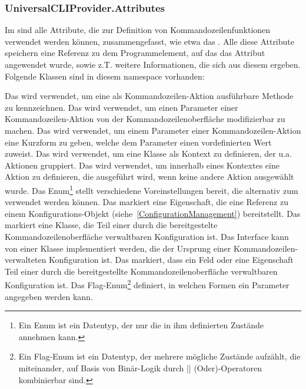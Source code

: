 \subsubsection{UniversalCLIProvider.Attributes}
Im  sind alle Attribute, die zur Definition von Kommandozeilenfunktionen verwendet werden können, zusammengefasst, wie etwa das .
Alle diese Attribute speichern eine Referenz zu dem Programmelement, auf das das Attribut angewendet wurde, sowie z.T. weitere Informationen, die sich aus diesem ergeben.
Folgende Klassen sind in diesem namespace vorhanden:
\begin{outline}
 \1 Das  wird verwendet, um eine als Kommandozeilen-Aktion ausführbare Methode zu kennzeichnen.
 \1 Das  wird verwendet, um einen Parameter einer Kommandozeilen-Aktion von der Kommandozeilenoberfläche modifizierbar zu machen.
 \1 Das  wird verwendet, um einem Parameter einer Kommandozeilen-Aktion eine Kurzform zu geben, welche dem Parameter einen vordefinierten Wert zuweist.
 \1 Das  wird verwendet, um eine Klasse als Kontext zu definieren, der u.a. Aktionen gruppiert.
 \1 Das  wird verwendet, um innerhalb eines Kontextes eine Aktion zu definieren, die ausgeführt wird, wenn keine andere Aktion ausgewählt wurde.
 \1 Das Enum\footnote{Ein Enum ist ein Datentyp, der nur die in ihm definierten Zustände annehmen kann.} 
 stellt verschiedene Voreinstellungen bereit, die alternativ zum  verwendet werden können.
 \1 Das  markiert eine Eigenschaft, die eine Referenz zu einem Konfigurations-Objekt (siehe~\ref{ConfigurationManagement}) bereitstellt.
 \1 Das  markiert eine Klasse, die Teil einer durch die bereitgestelte Kommandozeilenoberfläche verwaltbaren Konfiguration ist.
 \1 Das Interface  kann von einer Klasse implementiert werden, die der Ursprung einer Kommandozeilen-verwalteten Konfiguration ist.
 \1 Das  markiert, dass ein Feld oder eine Eigenschaft Teil einer durch die bereitgestellte Kommandozeilenoberfläche verwaltbaren Konfiguration ist.
 \1 Das Flag-Enum\footnote{Ein Flag-Enum ist ein Datentyp, der mehrere mögliche Zustände aufzählt, die miteinander, auf Basis von Binär-Logik durch || (Oder)-Operatoren kombinierbar sind.}
  definiert, in welchen Formen ein Parameter angegeben werden kann.
\end{outline}
